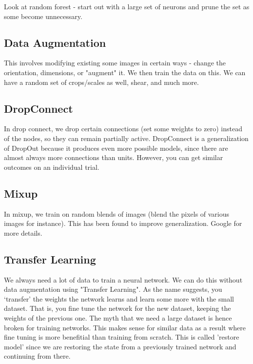 Look at random forest - start out with a large set of neurons and prune the set as some become unnecessary.

\subsection{Data Augmentation}

This involves modifying existing some images in certain ways - change the orientation, dimensions, or "augment" it. We then train the data on this. We can have a random set of crops/scales as well, shear, and much more.

\subsection{DropConnect}

In drop connect, we drop certain connections (set some weights to zero) instead of the nodes, so they can remain partially active. DropConnect is a generalization of DropOut because it produces even more possible models, since there are almost always more connections than units. However, you can get similar outcomes on an individual trial. 

\subsection{Mixup}

In mixup, we train on random blends of images (blend the pixels of various images for instance). This has been found to improve generalization. Google for more details.

\subsection{Transfer Learning}

We always need a lot of data to train a neural network. We can do this without data augmentation using "Transfer Learning". As the name suggests, you ‘transfer’ the weights the network learns and learn some more with the small dataset. That is, you fine tune the network for the new dataset, keeping the weights of the previous one. The myth that we need a large dataset is hence broken for training networks. This makes sense for similar data as a result where fine tuning is more benefitial than training from scratch. This is called 'restore model' since we are restoring the state from a previously trained network and continuing from there. 

